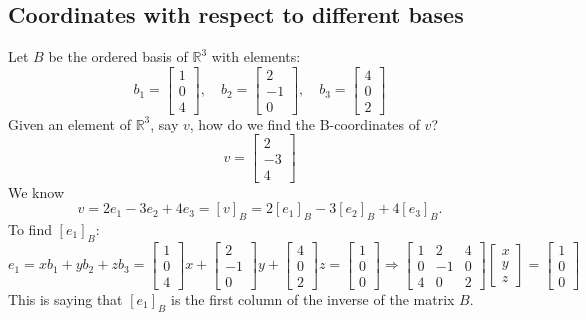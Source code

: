 \documentclass[a4paper, 9pt]{extarticle}
\begin{document}
\subsection{Coordinates with respect to different bases}
Let $B$ be the ordered basis of $\mathbb{R}^3$ with elements:
$$b_1 = \begin{bmatrix}
    1 \\
    0 \\
    4
  \end{bmatrix}, \quad
  b_2 = \begin{bmatrix}
    2  \\
    -1 \\
    0
  \end{bmatrix}, \quad
  b_3 = \begin{bmatrix}
    4 \\
    0 \\
    2
  \end{bmatrix}$$
Given an element of $\mathbb{R}^3$, say $v$, how do we find the B-coordinates of $v$?
$$
  v = \begin{bmatrix}
    2  \\
    -3 \\
    4
  \end{bmatrix}
$$
We know
$$v = 2e_1 - 3e_2 + 4e_3 = [v]_B = 2[e_1]_B - 3[e_2]_B + 4[e_3]_B.$$
To find $[e_1]_B$:
$$e_1 = xb_1 + yb_2 + zb_3 =
  \begin{bmatrix}
    1 \\
    0 \\
    4
  \end{bmatrix}x +
  \begin{bmatrix}
    2  \\
    -1 \\
    0
  \end{bmatrix}y +
  \begin{bmatrix}
    4 \\
    0 \\
    2
  \end{bmatrix}z
  =
  \begin{bmatrix}
    1 \\
    0 \\
    0
  \end{bmatrix}
  \Longrightarrow
  \begin{bmatrix}
    1 & 2  & 4 \\
    0 & -1 & 0 \\
    4 & 0  & 2
  \end{bmatrix}
  \begin{bmatrix}
    x \\
    y \\
    z
  \end{bmatrix}
  =
  \begin{bmatrix}
    1 \\
    0 \\
    0
  \end{bmatrix}
$$
This is saying that $[e_1]_B$ is the first column of the inverse of the matrix $B$.
\end{document}
